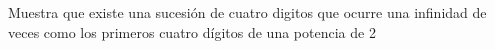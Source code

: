 \begin{problem}
    [\cite{112CP}]
    Muestra que existe una sucesi\'on de cuatro digitos
    que ocurre una infinidad de veces como los 
    primeros cuatro d\'igitos de una potencia de 2
    \label{112CP158}
\end{problem}